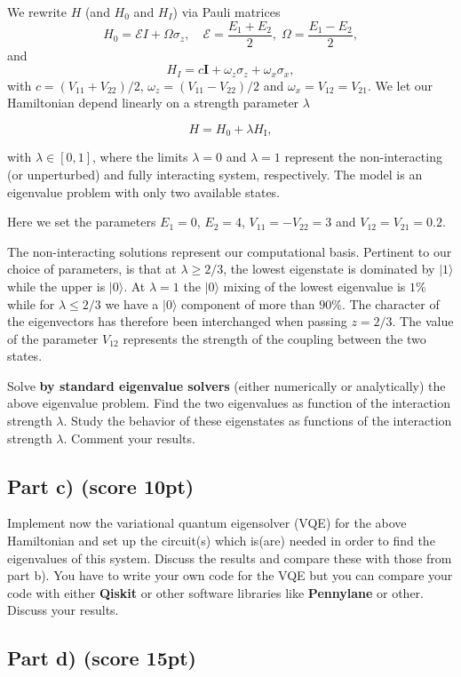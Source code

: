 \documentclass[%
oneside,                 %
final,                   %
10pt]{article}
\begin{document}
We rewrite $H$ (and $H_0$ and $H_I$)  via Pauli matrices
\[
H_0 = \mathcal{E} I + \Omega \sigma_z, \quad \mathcal{E} = \frac{E_1
  + E_2}{2}, \; \Omega = \frac{E_1-E_2}{2},
\]
and
\[
H_I = c \bm{I} +\omega_z\sigma_z + \omega_x\sigma_x,
\]
with $c = (V_{11}+V_{22})/2$, $\omega_z = (V_{11}-V_{22})/2$ and $\omega_x = V_{12}=V_{21}$.
We let our Hamiltonian depend linearly on a strength parameter $\lambda$

\[
H=H_0+\lambda H_\mathrm{I},
\]

with $\lambda \in [0,1]$, where the limits $\lambda=0$ and $\lambda=1$
represent the non-interacting (or unperturbed) and fully interacting
system, respectively.  The model is an eigenvalue problem with only
two available states.

Here we set the parameters $E_1=0$,
$E_2=4$, $V_{11}=-V_{22}=3$ and $V_{12}=V_{21}=0.2$.

The non-interacting solutions represent our computational basis.
Pertinent to our choice of parameters, is that at $\lambda\geq 2/3$,
the lowest eigenstate is dominated by $\vert 1\rangle$ while the upper
is $\vert 0 \rangle$. At $\lambda=1$ the $\vert 0 \rangle$ mixing of
the lowest eigenvalue is $1\%$ while for $\lambda\leq 2/3$ we have a
$\vert 0 \rangle$ component of more than $90\%$.  The character of the
eigenvectors has therefore been interchanged when passing $z=2/3$. The
value of the parameter $V_{12}$ represents the strength of the coupling
between the two states.

Solve \textbf{by standard eigenvalue solvers} (either numerically or analytically) the above eigenvalue problem.
Find the two eigenvalues as function of the interaction strength $\lambda$.
Study the behavior of these eigenstates as functions of the interaction strength $\lambda$.
Comment your results.

\subsection{Part c) (score 10pt)}

Implement now the variational quantum eigensolver (VQE) for the above
Hamiltonian and set up the circuit(s) which is(are) needed in order to find
the eigenvalues of this system. Discuss the results and compare these
with those from part b). You have to write your own code for the VQE but you can compare your code
with either \textbf{Qiskit} or other software libraries like \textbf{Pennylane} or other.
Discuss your results.

\subsection{Part d) (score 15pt)}
\end{document}
